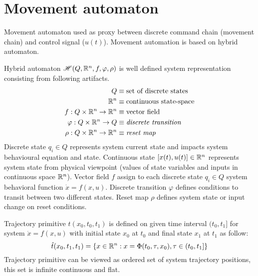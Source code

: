 \section{Movement automaton}
\noindent Movement automaton used as proxy between discrete command chain (movement chain) and control signal ($u(t)$). Movement automation is based on hybrid automaton.
\begin{definition} {Hybrid automaton $\mathscr{H}(Q,\mathbb{R}^n,f,\varphi,\rho)$} is well defined system representation consisting from following artifacts.
\begin{equation}
    \begin{aligned}
        Q &\equiv \textnormal{set of discrete states}\\
        \mathbb{R}^n &\equiv \textnormal{continuous state-space} \\
        f: Q\times \mathbb{R}^n \to \mathbb{R}^n & \equiv \textnormal{vector field}\\
        \varphi:Q\times \mathbb{R}^n \to Q & \equiv \textit{discrete transition}\\
        \rho : Q\times \mathbb{R}^n \to \mathbb{R}^n & \equiv\textit{reset map}\\
    \end{aligned}
\end{equation}
Discrete state $q_i \in Q$ represents system current state and impacts system behavioural equation and state. Continuous state $[x(t),u(t)]\in \mathbb{R}^n$ represents  system state from physical viewpoint (values of state variables and inputs in continuous space $\mathbb{R}^n$). Vector field $f$ assign to each discrete state $q_i \in Q$ system behavioral function $\dot{x} = f(x,u)$. Discrete transition $\varphi$ defines conditions to transit between two different states. Reset map $\rho$ defines system state or input change on reset conditions.
\end{definition} 

\begin{definition}{Trajectory primitive $\hat{t}(x_0,t_0,t_1)$} is defined on given time interval $(t_0,t_1]$ for system $\dot{x} = f(x,u)$ with initial state $x_0$ at $t_0$ and final state $x_1$ at $t_1$ as follow:
\begin{equation}
    \hat{t}(x_0,t_1,t_1) = \left\{ x\in\mathbb{R}^n: x = \Phi(t_0,\tau,x_0), \tau \in (t_0,t_1] \right\}
\end{equation}
Trajectory primitive can be viewed as ordered set of system trajectory positions, this set is infinite continuous and flat.    
\end{definition}

